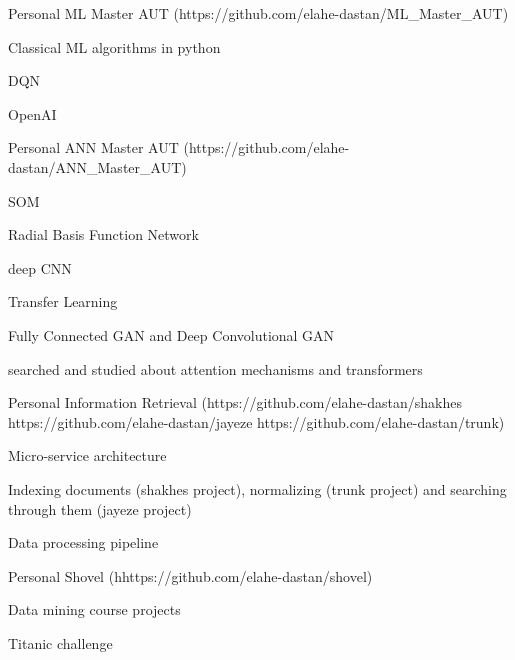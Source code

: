 \begin{cventries}
    \cventry
    {Personal} %
    {ML Master AUT ({\tiny https://github.com/elahe-dastan/ML\_Master\_AUT})} %
    {} %
    {} %
    {
      \begin{cvitems} %
        \item{Classical ML algorithms in python}
        \item{DQN}
        \item{OpenAI}
      \end{cvitems}
    }

    \cventry
    {Personal} %
    {ANN Master AUT ({\tiny https://github.com/elahe-dastan/ANN\_Master\_AUT})} %
    {} %
    {} %
    {
      \begin{cvitems} %
        \item SOM
        \item Radial Basis Function Network
        \item deep CNN
        \item Transfer Learning
        \item Fully Connected GAN and Deep Convolutional GAN
        \item searched and studied about attention mechanisms and transformers
      \end{cvitems}
    }

    \cventry
    {Personal} %
    {Information Retrieval ({\tiny https://github.com/elahe-dastan/shakhes} {\tiny https://github.com/elahe-dastan/jayeze} {\tiny https://github.com/elahe-dastan/trunk})} %
    {} %
    {} %
    {
      \begin{cvitems} %
        \item{Micro-service architecture}
        \item{Indexing documents (shakhes project), normalizing (trunk project) and searching through them (jayeze project)}
        \item{Data processing pipeline}
      \end{cvitems}
    }

    \cventry
    {Personal} %
    {Shovel ({\tiny hhttps://github.com/elahe-dastan/shovel})} %
    {} %
    {} %
    {
      \begin{cvitems} %
        \item{Data mining course projects}
        \item{Titanic challenge}
      \end{cvitems}
    }


\end{cventries}
